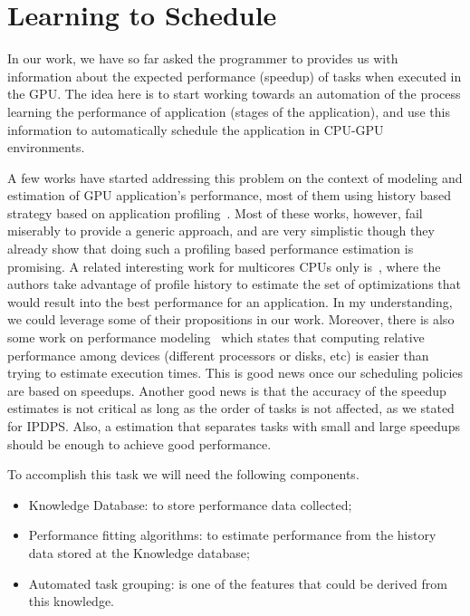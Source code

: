 \section{Learning to Schedule}

In our work, we have so far asked the programmer to provides us with
information about the expected performance (speedup) of tasks when executed in
the GPU.  The idea here is to start working towards an automation of the
process learning the performance of application (stages of the application),
and use this information to automatically schedule the application in CPU-GPU
environments.

A few works have started addressing this problem on the context of modeling and
estimation of GPU application's performance, most of them using history based
strategy based on application
profiling~\cite{Augonnet:2009:ACP:1884795.1884805,gregg10contention,5645393,Jimenez:2008:PRC:1505816.1505822,Kicherer:2011:CFM:1944862.1944883}.
Most of these works, however, fail miserably to provide a generic approach, and
are very simplistic though they already show that doing such a profiling based
performance estimation is promising. A related interesting work for
multicores CPUs only is~\cite{LUO:2009:INRIA-00436034:1}, where the authors
take advantage of profile history to estimate the set of optimizations that
would result into the best performance for an application. In my understanding,
we could leverage some of their propositions in our work. Moreover, there is
also some work on performance modeling~\cite{1138092,1498789} which states that
computing relative performance among devices (different processors or disks,
etc) is easier than trying to estimate execution times. This is good news once
our scheduling policies are based on speedups. Another good news is that the
accuracy of the speedup estimates is not critical as long as the order of tasks
is not affected, as we stated for IPDPS. Also, a estimation that separates
tasks with small and large speedups should be enough to achieve good
performance.


To accomplish this task we will need the following components.

\begin{itemize}
	\item Knowledge Database: to store performance data collected;

	\item Performance fitting algorithms: to estimate performance from the history data stored at the Knowledge database;

	\item Automated task grouping: is one of the features that could be derived from this knowledge.
\end{itemize}




